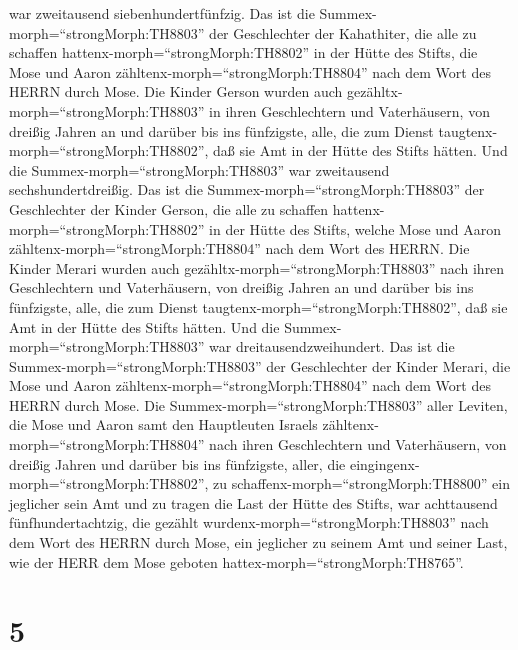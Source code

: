 war zweitausend siebenhundertfünfzig.  Das ist die
Summex-morph=``strongMorph:TH8803'' der Geschlechter der Kahathiter, die
alle zu schaffen hattenx-morph=``strongMorph:TH8802'' in der Hütte des
Stifts, die Mose und Aaron zähltenx-morph=``strongMorph:TH8804'' nach
dem Wort des HERRN durch Mose.  Die Kinder Gerson wurden
auch gezähltx-morph=``strongMorph:TH8803'' in ihren Geschlechtern und
Vaterhäusern,  von dreißig Jahren an und darüber bis ins
fünfzigste, alle, die zum Dienst taugtenx-morph=``strongMorph:TH8802'',
daß sie Amt in der Hütte des Stifts hätten.  Und die
Summex-morph=``strongMorph:TH8803'' war zweitausend sechshundertdreißig.
 Das ist die Summex-morph=``strongMorph:TH8803'' der
Geschlechter der Kinder Gerson, die alle zu schaffen
hattenx-morph=``strongMorph:TH8802'' in der Hütte des Stifts, welche
Mose und Aaron zähltenx-morph=``strongMorph:TH8804'' nach dem Wort des
HERRN.  Die Kinder Merari wurden auch
gezähltx-morph=``strongMorph:TH8803'' nach ihren Geschlechtern und
Vaterhäusern,  von dreißig Jahren an und darüber bis ins
fünfzigste, alle, die zum Dienst taugtenx-morph=``strongMorph:TH8802'',
daß sie Amt in der Hütte des Stifts hätten.  Und die
Summex-morph=``strongMorph:TH8803'' war dreitausendzweihundert.
 Das ist die Summex-morph=``strongMorph:TH8803'' der
Geschlechter der Kinder Merari, die Mose und Aaron
zähltenx-morph=``strongMorph:TH8804'' nach dem Wort des HERRN durch
Mose.  Die Summex-morph=``strongMorph:TH8803'' aller
Leviten, die Mose und Aaron samt den Hauptleuten Israels
zähltenx-morph=``strongMorph:TH8804'' nach ihren Geschlechtern und
Vaterhäusern,  von dreißig Jahren und darüber bis ins
fünfzigste, aller, die eingingenx-morph=``strongMorph:TH8802'', zu
schaffenx-morph=``strongMorph:TH8800'' ein jeglicher sein Amt und zu
tragen die Last der Hütte des Stifts,  war achttausend
fünfhundertachtzig,  die gezählt
wurdenx-morph=``strongMorph:TH8803'' nach dem Wort des HERRN durch Mose,
ein jeglicher zu seinem Amt und seiner Last, wie der HERR dem Mose
geboten hattex-morph=``strongMorph:TH8765''.

\hypertarget{section-4}{%
\section{5}\label{section-4}}


